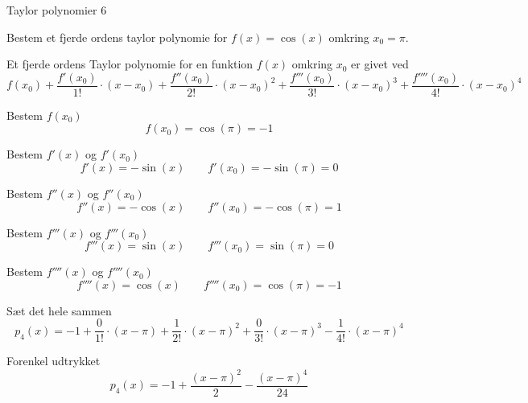 \documentclass{article}
\begin{document}
\begin{exercise}{Taylor polynomier 6}
	
	Bestem et fjerde ordens taylor polynomie for $f(x) = \cos(x)$
	omkring $x_0 = \pi$.
	
	
	\hint
	Et fjerde ordens Taylor polynomie for en funktion $f(x)$
	omkring $x_0$ er givet ved
	\[
	f(x_0) + \frac{f'(x_0)}{1!} \cdot (x - x_0) 
	+ \frac{f''(x_0)}{2!} \cdot (x - x_0)^2 
	+ \frac{f'''(x_0)}{3!} \cdot (x - x_0)^3 
	+ \frac{f''''(x_0)}{4!} \cdot (x - x_0)^4
	\]
	
	
	\hint
	Bestem $f(x_0)$
	\[
	f(x_0)  = \cos(\pi) = -1
	\]
	
	\hint
	Bestem $f'(x)$ og $f'(x_0)$
	\[
	f'(x) = -\sin(x) \qquad f'(x_0)= -\sin(\pi) = 0
	\]
	
	\hint
	Bestem $f''(x)$ og $f''(x_0)$
	\[
	f''(x) = -\cos(x) \qquad f''(x_0)  = - \cos(\pi) = 1
	\]
	
	\hint
	Bestem $f'''(x)$ og $f'''(x_0)$
	\[
	f'''(x) = \sin(x) \qquad f'''(x_0) =  \sin(\pi) = 0
	\]
	
	\hint
	Bestem $f''''(x)$ og $f''''(x_0)$
	\[
	f''''(x) = \cos(x) \qquad f''''(x_0) =  \cos(\pi) = -1
	\]
	
	\hint
	Sæt det hele sammen
	\[
	p_4(x) = -1 + \frac{0}{1!} \cdot (x-\pi) + \frac{1}{2!} \cdot (x-\pi)^2 + \frac{0}{3!} \cdot (x-\pi)^3 - \frac{1}{4!} \cdot (x-\pi)^4 	
	\]
	
	\hint
	Forenkel udtrykket
	\[
	p_4(x) = -1 + \frac{(x-\pi)^2}{2} - \frac{(x-\pi)^4}{24}
	\]
	
	
\end{exercise}
\end{document}

